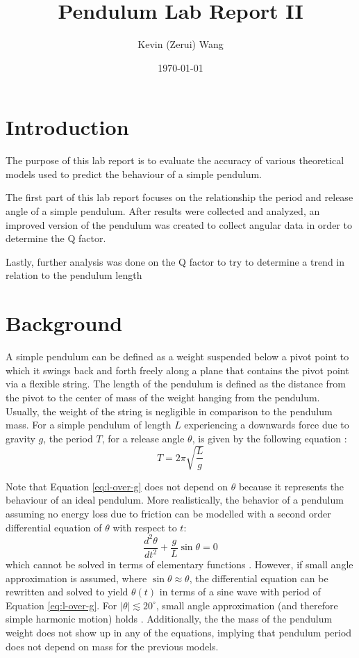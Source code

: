 \documentclass[12pt]{article}
\title{Pendulum Lab Report II}
\author{Kevin (Zerui) Wang}
\date{\today}
\begin{document}
\maketitle
\newpage



\section{Introduction}
{\color{blue}The purpose of this lab report is to evaluate the accuracy of various theoretical models used to predict the behaviour of a simple pendulum.}

The first part of this lab report focuses on the relationship the period and release angle of a simple pendulum. After results were collected and analyzed, an improved version of the pendulum was created to collect angular data in order to determine the Q factor.

{\color{blue}Lastly, further analysis was done on the Q factor to try to determine a trend in relation to the pendulum length}

\section{Background} \label{Background}
{\color{blue}A simple pendulum can be defined as a weight suspended below a pivot point to which it swings back and forth freely along a plane that contains the pivot point via a flexible string. The length of the pendulum is defined as the distance from the pivot to the center of mass of the weight hanging from the pendulum. Usually, the weight of the string is negligible in comparison to the pendulum mass.} For a simple pendulum of length $L$ experiencing a downwards force due to gravity $g$, the period $T$, for a release angle $\theta$, is given by the following equation \cite{the-simple-pendulum}:
\begin{equation} \label{eq:l-over-g}
    T = 2\pi \sqrt{\frac{L}{g}}
\end{equation}

{\color{blue}Note that Equation \ref{eq:l-over-g} does not depend on $\theta$ because it represents the behaviour of an ideal pendulum.} More realistically, the behavior of a pendulum assuming no energy loss due to friction can be modelled with a second order differential equation of $\theta$ with respect to $t$:
\begin{equation} \label{eq:diffeq-pendulum}
    \frac{d^2\theta}{dt^2} + \frac{g}{L}\sin{\theta} = 0
\end{equation}
{\color{blue}which cannot be solved in terms of elementary functions \cite{no-elementary-fns}. However, if small angle approximation is assumed, where $\sin\theta \approx \theta$, the differential equation can be rewritten and solved to yield $\theta(t)$ in terms of a sine wave with period of Equation \ref{eq:l-over-g}. For $|\theta| \lesssim 20^{\circ}$, small angle approximation (and therefore simple harmonic motion) holds \cite{the-simple-pendulum}.} Additionally, the the mass of the pendulum weight does not show up in any of the equations, implying that pendulum period does not depend on mass for the previous models.
\end{document}
